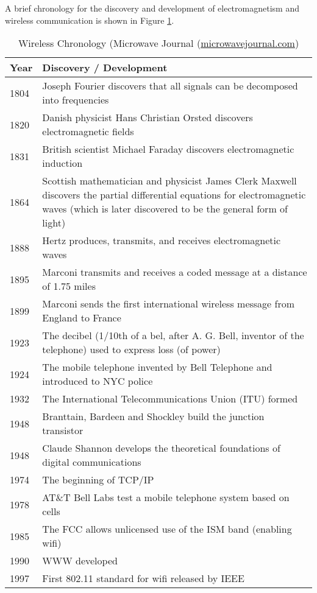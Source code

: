 A brief chronology for the discovery and development of electromagnetism and wireless
communication is shown in Figure \ref{chronology}.
\begin{table}
\begin{tabular}{|l|p{12cm}|}
\hline
\bf Year & \bf Discovery / Development \\
\hline
1804 & Joseph Fourier discovers that all signals can be decomposed into frequencies \\
1820 & Danish physicist Hans Christian Orsted discovers electromagnetic fields \\
1831 & British scientist Michael Faraday discovers electromagnetic induction \\
1864 & Scottish mathematician and physicist James Clerk Maxwell discovers the partial differential equations for electromagnetic waves
	(which is later discovered to be the general form of light)\\
1888 & Hertz produces, transmits, and receives electromagnetic waves \\
1895 & Marconi transmits and receives a coded message at a distance of 1.75 miles \\
1899 & Marconi sends the first international wireless message from England to France\\
1923 & The decibel (1/10th of a bel, after A. G. Bell, inventor of the telephone) used to express loss (of power) \\
1924 & The mobile telephone invented by Bell Telephone and introduced to NYC police \\
1932 & The International Telecommunications Union (ITU) formed \\
1948 & Branttain, Bardeen and Shockley build the junction transistor\\
1948 & Claude Shannon develops the theoretical foundations of digital communications \\
1974 & The beginning of TCP/IP\\
1978 & AT\&T Bell Labs test a mobile telephone system based on cells\\
1985 & The FCC allows unlicensed use of the ISM band (enabling wifi) \\
1990 & WWW developed\\
1997 & First 802.11 standard for wifi released by IEEE \\
\hline
\end{tabular}
	\caption{Wireless Chronology (Microwave Journal (\url{microwavejournal.com})}\label{chronology}
\end{table}

